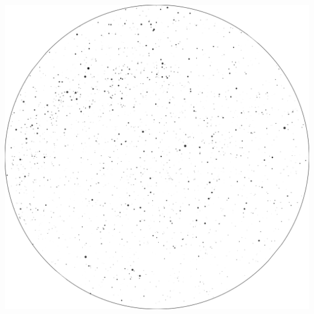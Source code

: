 \documentclass{./SAS-class-skygen}
\begin{document}
	\vspace{0.5cm}
    \begin{center}
    \includegraphics[width=\textwidth]{./pics/skychart52.png}
    \end{center}
    
    
\end{document}
